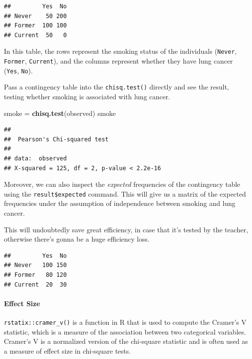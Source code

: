 \documentclass[
]{ctexart}
\newenvironment{Shaded}{\begin{snugshade}}{\end{snugshade}}
\newcommand{\FunctionTok}[1]{\textcolor[rgb]{0.13,0.29,0.53}{\textbf{#1}}}
\newcommand{\NormalTok}[1]{#1}
\newcommand{\OtherTok}[1]{\textcolor[rgb]{0.56,0.35,0.01}{#1}}
\newcommand{\SpecialCharTok}[1]{\textcolor[rgb]{0.81,0.36,0.00}{\textbf{#1}}}
\begin{document}
\begin{verbatim}
##         Yes  No
## Never    50 200
## Former  100 100
## Current  50   0
\end{verbatim}

In this table, the rows represent the smoking status of the individuals
(\texttt{Never}, \texttt{Former}, \texttt{Current}), and the columns
represent whether they have lung cancer (\texttt{Yes}, \texttt{No}).

Pass a contingency table into the \texttt{chisq.test()} directly and see
the result, testing whether smoking is associated with lung cancer.

\begin{Shaded}
\begin{Highlighting}[]
\NormalTok{smoke }\OtherTok{=} \FunctionTok{chisq.test}\NormalTok{(observed)}
\NormalTok{smoke}
\end{Highlighting}
\end{Shaded}

\begin{verbatim}
## 
##  Pearson's Chi-squared test
## 
## data:  observed
## X-squared = 125, df = 2, p-value < 2.2e-16
\end{verbatim}

Moreover, we can also inspect the \emph{expected} frequencies of the
contingency table using the \texttt{result\$expected} command. This will
give us a matrix of the expected frequencies under the assumption of
independence between smoking and lung cancer.

This will undoubtedly save great efficiency, in case that it's tested by
the teacher, otherwise there's gonna be a huge efficiency loss.

\begin{Shaded}
\end{Shaded}

\begin{verbatim}
##         Yes  No
## Never   100 150
## Former   80 120
## Current  20  30
\end{verbatim}

\hypertarget{effect-size}{%
\paragraph{Effect Size}\label{effect-size}}

\texttt{rstatix::cramer\_v()} is a function in R that is used to compute
the Cramer's V statistic, which is a measure of the association between
two categorical variables. Cramer's V is a normalized version of the
chi-square statistic and is often used as a measure of effect size in
chi-square tests.
\end{document}
